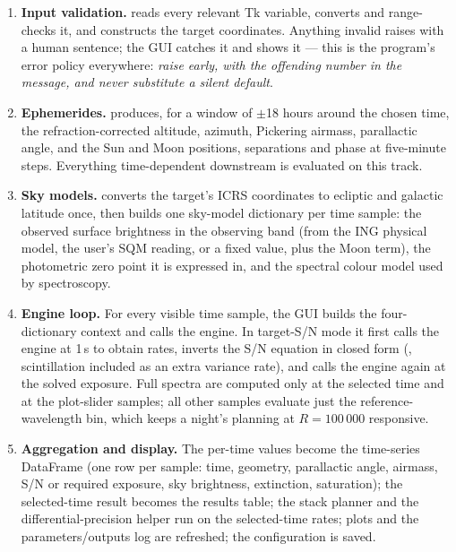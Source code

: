 \begin{enumerate}
\item \textbf{Input validation.}  reads every
  relevant Tk variable, converts and range-checks it, and constructs the
  target coordinates. Anything invalid raises  with a
  human sentence; the GUI catches it and shows it --- this is the
  program's error policy everywhere: \emph{raise early, with the
  offending number in the message, and never substitute a silent
  default}.
\item \textbf{Ephemerides.} 
  produces, for a window of $\pm$18 hours around the chosen time, the
  refraction-corrected altitude, azimuth, Pickering airmass, parallactic
  angle, and the Sun and Moon positions, separations and phase at
  five-minute steps. Everything time-dependent downstream is evaluated on
  this track.
\item \textbf{Sky models.}  converts the
  target's ICRS coordinates to ecliptic and galactic latitude once, then
  builds one sky-model dictionary per time sample: the observed surface
  brightness in the observing band (from the ING physical model, the
  user's SQM reading, or a fixed value, plus the Moon term), the
  photometric zero point it is expressed in, and the spectral colour
  model used by spectroscopy.
\item \textbf{Engine loop.} For every visible time sample, the GUI builds
  the four-dictionary context and calls the engine. In target-S/N mode it
  first calls the engine at 1\,s to obtain rates, inverts the S/N
  equation in closed form (,
  scintillation included as an extra variance rate), and calls the
  engine again at the solved exposure. Full spectra are computed only at
  the selected time and at the plot-slider samples; all other samples
  evaluate just the reference-wavelength bin, which keeps a night's
  planning at $R = 100\,000$ responsive.
\item \textbf{Aggregation and display.} The per-time values become the
  time-series DataFrame (one row per sample: time, geometry, parallactic
  angle, airmass, S/N or required exposure, sky brightness, extinction,
  saturation); the selected-time result becomes the results table; the
  stack planner and the differential-precision helper run on the
  selected-time rates; plots and the parameters/outputs log are
  refreshed; the configuration is saved.
\end{enumerate}

